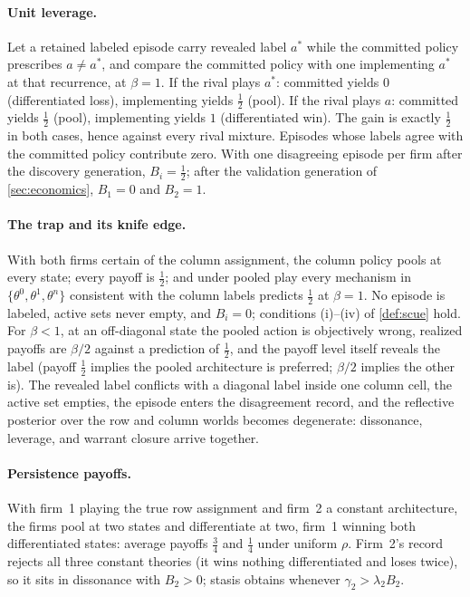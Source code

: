 \documentclass[11pt]{article}
\theoremstyle{definition}
\begin{document}
\paragraph{Unit leverage.}
Let a retained labeled episode carry revealed label $a^{*}$ while the
committed policy prescribes $a\neq a^{*}$, and compare the committed policy
with one implementing $a^{*}$ at that recurrence, at $\beta=1$.  If the
rival plays $a^{*}$: committed yields $0$ (differentiated loss),
implementing yields $\tfrac12$ (pool).  If the rival plays $a$: committed
yields $\tfrac12$ (pool), implementing yields $1$ (differentiated win).  The
gain is exactly $\tfrac12$ in both cases, hence against every rival mixture.
Episodes whose labels agree with the committed policy contribute zero.  With
one disagreeing episode per firm after the discovery generation,
$B_i=\tfrac12$; after the validation generation of \cref{sec:economics},
$B_1=0$ and $B_2=1$.

\paragraph{The trap and its knife edge.}
With both firms certain of the column assignment, the column policy pools at
every state; every payoff is $\tfrac12$; and under pooled play every
mechanism in $\{\theta^0,\theta^1,\theta^n\}$ consistent with the column
labels predicts $\tfrac12$ at $\beta=1$.  No episode is labeled, active sets
never empty, and $B_i=0$; conditions (i)--(iv) of \cref{def:scue} hold.  For
$\beta<1$, at an off-diagonal state the pooled action is objectively wrong,
realized payoffs are $\beta/2$ against a prediction of $\tfrac12$, and the
payoff level itself reveals the label (payoff $\tfrac12$ implies the pooled
architecture is preferred; $\beta/2$ implies the other is).  The revealed
label conflicts with a diagonal label inside one column cell, the active set
empties, the episode enters the disagreement record, and the reflective
posterior over the row and column worlds becomes degenerate: dissonance,
leverage, and warrant closure arrive together.

\paragraph{Persistence payoffs.}
With firm~1 playing the true row assignment and firm~2 a constant
architecture, the firms pool at two states and differentiate at two, firm~1
winning both differentiated states: average payoffs $\tfrac34$ and
$\tfrac14$ under uniform $\rho$.  Firm~2's record rejects all three constant
theories (it wins nothing differentiated and loses twice), so it sits in
dissonance with $B_2>0$; stasis obtains whenever
$\gamma_2>\lambda_2B_2$.
\end{document}
